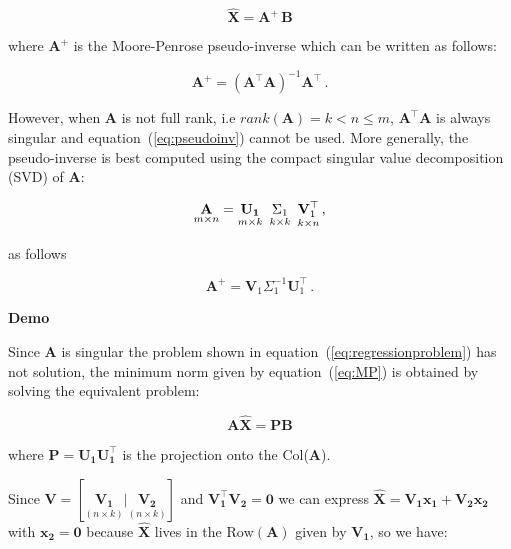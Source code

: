 \begin{equation}
\label{eq:MP}
\hat{\mathbf{X}}=\mathbf{A}^{\!\!+}\,\mathbf{B}
\end{equation}

\noindent where $\mathbf{A}^{\!\!+}$ is the Moore-Penrose pseudo-inverse
which can be written as follows: 

\begin{equation}
\label{eq:pseudoinv}
\mathbf{A}^{\!\!+}= (\mathbf{A}^{\!\!\top} \mathbf{A})^{-1}\mathbf{A}^{\!\!\top} \, .
\end{equation}

However, when $\mathbf{A}$ is not full rank, i.e
$rank(\mathbf{A})=k <  n \leq m$, $\mathbf{A}^\top \mathbf{A}$ is
always singular and equation~(\ref{eq:pseudoinv}) cannot be used.
More generally, the pseudo-inverse is best computed using the compact
singular value decomposition (SVD) of $\mathbf{A}$:

\begin{equation}
    \label{eq:compactsvd}
    \underset{m \times n}{\mathbf{A}}=
    \underset{m \times k}{\mathbf{U_1}} \enskip
    \underset{k \times k}{\Sigma_1} \enskip
    \underset{k \times n}{\mathbf{V}_1^{\top}} \, ,
\end{equation}

\noindent as follows

\begin{equation}
\label{eq:pseudoinversesvd}
\mathbf{A}^{\!\!+} = \mathbf{V}_1 \Sigma_1^{-1} \mathbf{U}_1^\top \, .
\end{equation}


\textbf{Demo}\quad

Since $\mathbf{A}$ is singular the problem shown in
equation~(\ref{eq:regressionproblem}) has not solution, the minimum norm given
by equation~(\ref{eq:MP}) is obtained by solving the equivalent problem:

\begin{equation*}
\label{eq:proyectorsol}
\mathbf{A \hat{X} = PB} 
\end{equation*}

\noindent where $\mathbf{P=U_1 U_1^\top}$ is the projection onto the
Col($\mathbf{A}$). 

Since $\mathbf{V} = [\underset{(n \times k)}{\mathbf{V_1}} |
\underset{(n \times k)}{\mathbf{V_2}}]$ and $\mathbf{V_1^\top V_2 =
0}$ we can express $\mathbf{\hat{X}} = \mathbf{V_1 x_1 + V_2 x_2}$
with $\mathbf{x_2=0}$ because $\mathbf{\hat{X}}$ lives in the
$\text{Row}(\mathbf{A})$ given by $\mathbf{V_1}$, so we have:

